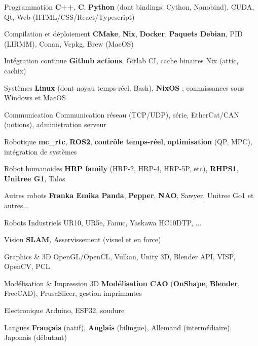 

\begin{cvskills}

  \cvskill
    {Programmation} %
    {\textbf{C++}, \textbf{C}, \textbf{Python} (dont bindings: Cython, Nanobind), CUDA, Qt, Web (HTML/CSS/React/Typescript)} %

  \cvskill
    {Compilation et déploiement} %
    {\textbf{CMake}, \textbf{Nix}, \textbf{Docker}, \textbf{Paquets Debian}, PID (LIRMM), Conan, Vcpkg, Brew (MacOS)}

  \cvskill
    {Intégration continue} %
    {\textbf{Github actions}, Gitlab CI, cache binaires Nix (attic, cachix)} %

  \cvskill
    {Systèmes}
    {\textbf{Linux} (dont noyau temps-réel, Bash), \textbf{NixOS} ; connaissances sous Windows et MacOS}
 
  \cvskill
    {Communication}
    {Communication réseau (TCP/UDP), série, EtherCat/CAN (notions), administration serveur}

  \cvskill
    {Robotique} %
    {\textbf{mc\_rtc}, \textbf{ROS2}, \textbf{contrôle temps-réel}, \textbf{optimisation} (QP, MPC), intégration de systèmes}

  \cvskill
    {Robot humanoides} %
    {\textbf{HRP family} (HRP-2, HRP-4, HRP-5P, etc), \textbf{RHPS1}, \textbf{Unitree G1}, Talos}

  \cvskill
    {Autres robots}
    {\textbf{Franka Emika Panda}, \textbf{Pepper}, \textbf{NAO}, Sawyer, Unitree Go1 et autres...} %

  \cvskill
    {Robots Industriels}
    {UR10, UR5e, Fanuc, Yaskawa HC10DTP, ...} %

  \cvskill
    {Vision} %
    {\textbf{SLAM}, Asservissement (visuel et en force)} %

  \cvskill
    {Graphics \& 3D}
    {OpenGL/OpenCL, Vulkan, Unity 3D, Blender API, VISP, OpenCV, PCL} %

  \cvskill
    {Modélisation \& Impression 3D} %
    {\textbf{Modélisation CAO} (\textbf{OnShape}, \textbf{Blender}, FreeCAD), PrusaSlicer, gestion imprimantes} %

  \cvskill
    {Electronique}
    {Arduino, ESP32, soudure}


  \cvskill
    {Langues} %
    {\textbf{Français} (natif), \textbf{Anglais} (bilingue), Allemand (intermédiaire), Japonais (débutant)} %

\end{cvskills}
